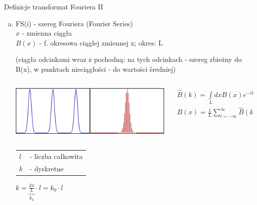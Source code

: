 \begin{frame}{Definicje transformat Fouriera II}
	\begin{enumerate}[b)]
		\item FS(i) - szereg Fouriera (Fourier Series) \\
		$x$ - zmienna ciągła \\
		$B(x)$ - f. okresowa ciągłej zmiennej x; okres: L
		\begin{center}
			(ciągła odcinkami wraz z pochodną: na tych odcinkach - szereg zbieżny do B(x), w punktach nieciągłości - do wartości średniej)
		\end{center}
        \begin{columns}
            \begin{column}{0.35\textwidth}
                \includegraphics[width=\textwidth]{img/16/fs_wykres1.png}
            \end{column}
            \begin{column}{0.65\textwidth}
                \begin{block}
                    \centering
                    \renewcommand{\arraystretch}{1.5}
                    \setlength{\abovedisplayskip}{0pt}
                    \setlength{\belowdisplayskip}{0pt}
                    \setlength{\abovedisplayshortskip}{0pt}
                    \setlength{\belowdisplayshortskip}{0pt}
                    \[
                        \begin{array}{c}
                            \widehat{B}(k) = \int\limits_{L}dx B(x) e^{-ikx} \\
                            B(x) = \frac{1}{L}\sum\limits_{l = -\infty}^{\infty} \widehat{B}(k) e^{ikx}
                        \end{array}
                        \tag{16.2}
                    \]
                \end{block}
            \end{column}
        \end{columns}
		\begin{tabular}{ll}
			$l$ & - liczba całkowita \\
			$k$ & - dyskretne
		\end{tabular}
		\hfill $k = \underbrace{\frac{2 \pi}{L}}_{k_0} \cdot l = k_0 \cdot l$
	\end{enumerate}
\end{frame}
